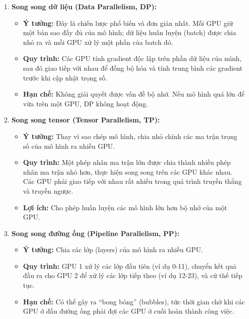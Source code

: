 \begin{enumerate}
    \item \textbf{Song song dữ liệu (Data Parallelism, DP):}
        \begin{itemize}
            \item \textbf{Ý tưởng:} Đây là chiến lược phổ biến và đơn giản nhất. Mỗi GPU giữ một bản sao đầy đủ của mô hình; dữ liệu huấn luyện (batch) được chia nhỏ ra và mỗi GPU xử lý một phần của batch đó.
            \item \textbf{Quy trình:} Các GPU tính gradient độc lập trên phần dữ liệu của mình, sau đó giao tiếp với nhau để đồng bộ hóa và tính trung bình các gradient trước khi cập nhật trọng số.
            \item \textbf{Hạn chế:} Không giải quyết được vấn đề bộ nhớ. Nếu mô hình quá lớn để vừa trên một GPU, DP không hoạt động.
        \end{itemize}
    \item \textbf{Song song tensor (Tensor Parallelism, TP):}
        \begin{itemize}
            \item \textbf{Ý tưởng:} Thay vì sao chép mô hình, chia nhỏ chính các ma trận trọng số của mô hình ra nhiều GPU.
            \item \textbf{Quy trình:} Một phép nhân ma trận lớn được chia thành nhiều phép nhân ma trận nhỏ hơn, thực hiện song song trên các GPU khác nhau. Các GPU phải giao tiếp với nhau rất nhiều trong quá trình truyền thẳng và truyền ngược.
            \item \textbf{Lợi ích:} Cho phép huấn luyện các mô hình lớn hơn bộ nhớ của một GPU.
        \end{itemize}
    \item \textbf{Song song đường ống (Pipeline Parallelism, PP):}
        \begin{itemize}
            \item \textbf{Ý tưởng:} Chia các lớp (layers) của mô hình ra nhiều GPU.
            \item \textbf{Quy trình:} GPU 1 xử lý các lớp đầu tiên (ví dụ 0-11), chuyển kết quả đầu ra cho GPU 2 để xử lý các lớp tiếp theo (ví dụ 12-23), và cứ thế tiếp tục.
            \item \textbf{Hạn chế:} Có thể gây ra “bong bóng” (bubbles), tức thời gian chờ khi các GPU ở đầu đường ống phải đợi các GPU ở cuối hoàn thành công việc.
        \end{itemize}
\end{enumerate}


